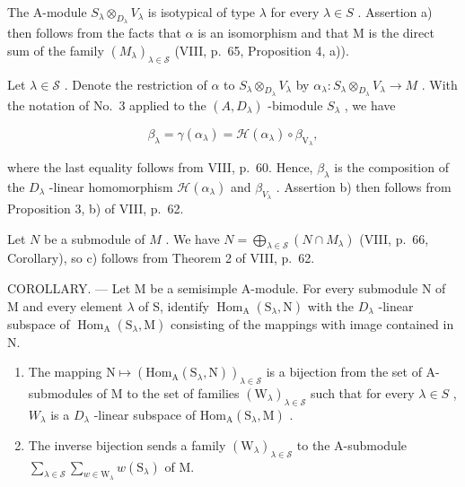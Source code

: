 The A-module \(S_{\lambda} \otimes_{D_{\lambda}} V_{\lambda}\) is isotypical of type \(\lambda\) for every \(\lambda \in S\) . Assertion a) then follows from the facts that \(\alpha\) is an isomorphism and that M is the direct sum of the family \((M_{\lambda})_{\lambda \in \mathcal{S}}\) (VIII, p.~65, Proposition 4, a)).

Let \(\lambda \in \mathcal{S}\) . Denote the restriction of \(\alpha\) to \(S_{\lambda} \otimes_{D_{\lambda}} V_{\lambda}\) by \(\alpha_{\lambda}: S_{\lambda} \otimes_{D_{\lambda}} V_{\lambda} \to M\) . With the notation of No.~3 applied to the \((A, D_{\lambda})\) -bimodule \(S_{\lambda}\) , we have

\[
\beta_ {\lambda} = \gamma (\alpha_ {\lambda}) = \mathcal {H} (\alpha_ {\lambda}) \circ \beta_ {\mathrm{V} _ {\lambda}},
\]

where the last equality follows from VIII, p.~60. Hence, \(\beta_{\lambda}\) is the composition of the \(D_{\lambda}\) -linear homomorphism \(\mathcal{H}(\alpha_{\lambda})\) and \(\beta_{V_{\lambda}}\) . Assertion b) then follows from Proposition 3, b) of VIII, p.~62.

Let \(N\) be a submodule of \(M\) . We have \(N = \bigoplus_{\lambda \in \mathcal{S}} (N \cap M_{\lambda})\) (VIII, p.~66, Corollary), so c) follows from Theorem 2 of VIII, p.~62.

COROLLARY. --- Let M be a semisimple A-module. For every submodule N of M and every element \(\lambda\) of S, identify \(\operatorname{Hom}_{\mathrm{A}}(\mathrm{S}_{\lambda},\mathrm{N})\) with the \(D_{\lambda}\) -linear subspace of \(\operatorname{Hom}_{\mathrm{A}}(\mathrm{S}_{\lambda},\mathrm{M})\) consisting of the mappings with image contained in N.

\begin{enumerate}
\def\labelenumi{\alph{enumi})}
\item
  The mapping \(\mathrm{N}\mapsto(\mathrm{Hom}_{\mathrm{A}}(\mathrm{S}_{\lambda},\mathrm{N}))_{\lambda\in\mathcal{S}}\) is a bijection from the set of A-submodules of M to the set of families \((\mathrm{W}_{\lambda})_{\lambda\in\mathcal{S}}\) such that for every \(\lambda\in S\) , \(W_{\lambda}\) is a \(D_{\lambda}\) -linear subspace of \(\mathrm{Hom}_{\mathrm{A}}(\mathrm{S}_{\lambda},\mathrm{M})\) .
\item
  The inverse bijection sends a family \((\mathrm{W}_{\lambda})_{\lambda \in \mathcal{S}}\) to the A-submodule \(\sum_{\lambda \in \mathcal{S}}\sum_{w\in \mathrm{W}_{\lambda}}w(\mathrm{S}_{\lambda})\) of M.
\end{enumerate}

